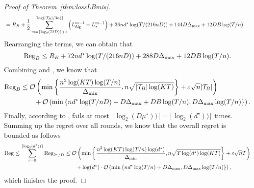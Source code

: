 \begin{proof}[Proof of Theorem~\ref{thm:lossLBmis}]
\begin{align*}
        &= R_B + \frac{1}{2}\sum_{m=\lceil\log_2(72D)\rceil+1}^{\lceil\log(|{\mathcal{T}}_B|/3n)\rceil} \left(L_{{\mathsf{Alg}}}^{m-1}-L_{\star}^{m-1}\right) + 36nd^\star\log(T/(216nD))+144D\Delta_{\max}+12DB\log(T/n).
    \end{align*}
    Rearranging the terms, we can obtain that
    \begin{align}\label{eqn:reg_B_2}
        {\mathrm{Reg}}_B \leq R_B + 72nd^\star\log(T/(216nD))+288D\Delta_{\max}+12DB\log(T/n).
    \end{align}
    Combining  and , we know that
    \begin{align}
        {\mathrm{Reg}}_B &\leq \mathcal{O}\left(\min\left\{\frac{n^2\log(KT)\log(T/n)}{\Delta_{\min}},n\sqrt{|{\mathcal{T}}_B|\log(KT)}\right\}+\varepsilon\sqrt{n}|{\mathcal{T}}_B|\right) \nonumber \\
        &\qquad +\mathcal{O}\left( \min\left\{nd^\star\log (T/nD)+D\Delta_{\max}+DB\log(T/n),D\Delta_{\max}\log (T/n)\right\}\right).\label{eqn:reg_B_final}
    \end{align}
    Finally, according to ,  fails at most $\lceil\log_2(D\mu^\star))\rceil = \lceil\log_2(d^\star))\rceil$ times. Summing up the regret over all rounds, we know that the overall regret is bounded as follows
    \begin{align*}
        {\mathrm{Reg}} \leq \sum_{r=0}^{\lceil\log_2(d^\star))\rceil}{\mathrm{Reg}}_{2^r/D} &\leq \mathcal{O}\left(\min\left\{\frac{n^2\log(KT)\log(T/n)\log(d^\star)}{\Delta_{\min}},n\sqrt{T\log(d^\star)\log(KT)}\right\}+\varepsilon\sqrt{n}T\right) \\
        &\qquad + \log(d^\star)\cdot \mathcal{O}\left( \min\left\{nd^\star\log (T/n)+D\Delta_{\max},D\Delta_{\max}\log (T/n)\right\}\right),
    \end{align*}
	which finishes the proof.
\end{proof}